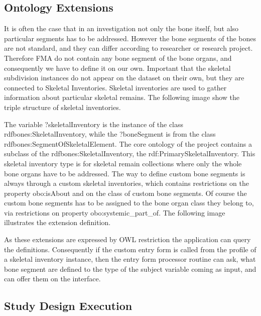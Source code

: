 \subsection{Ontology Extensions}

It is often the case that in an investigation not only the bone itself, but also particular segments has to be addressed. However the bone segments of the bones are not standard, and they can differ according to researcher or research project. Therefore FMA do not contain any bone segment of the bone organs, and consequently we have to define it on our own. 
Important that the skeletal subdivision instances do not appear on the dataset on their own, but they are connected to Skeletal Inventories. Skeletal inventories are used to gather information about particular skeletal remains.  The following image show the triple structure of skeletal inventories.


The variable ?skeletalInventory is the instance of the class rdfbones:SkeletalInventory, while the ?boneSegment is from the class rdfbones:SegmentOfSkeletalElement. The core ontology of the project contains a subclass of the rdfbones:SkeletalInventory, the rdf:PrimarySkeletalInventory. This skeletal inventory type is for skeletal remain collections where only the whole bone organs have to be addressed.  The way to define custom bone segments is always through a custom skeletal inventories, which contains restrictions on the property obo:isAbout and on the class of custom bone segments. Of course the custom bone segments has to be assigned to the bone organ class they belong to, via restrictions on property obo:systemic\_part\_of. The following image illustrates the extension definition.



As these extensions are expressed by OWL restriction the application can query the definitions. Consequently if the custom entry form is called from the profile of a skeletal inventory instance, then the entry form processor routine can ask, what bone segment are defined to the type of the subject variable coming as input, and can offer them on the interface.

\subsection{Study Design Execution}

